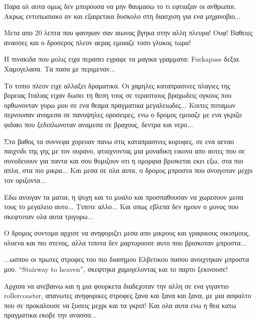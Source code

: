 Παρα ολ αυτα ομως δεν μπορουσα να μην θαυμασω το τι εφτιαξαν οι ανθρωποι. Ακρως εντυπωσιακο αν και εξαιρετικα δυσκολο στη διασχιση για ενα μηχανοβιο...

Μετα απο 20 λεπτα που φανηκαν σαν αιωνας βγηκα στην αλλη πλευρα! Ουφ! Βαθειες ανασσες και ο δροσερος πλεον αερας εμοιαζε τοσο γλυκος τωρα!


Η πινακιδα που μολις ειχα περασει εγραφε τα μαγικα γραμματα: Furkapass δεξια. 
Χαμογελασα. Τα πασα με περιμεναν...


Το τοπιο πλεον ειχε αλλαξει δραματικα. Οι χαμηλες καταπρασινες πλαγιες της βορειας Ιταλιας ειχαν δωσει τη θεση τους σε τεραστιους βραχωδεις ογκους που ορθωνονταν γυρω μου σε ενα θεαμα πραγματικα μεγαλειωδες...
Κοιτες ποταμων περνουσαν αναμεσα σε πανυψηλες οροσειρες, ενω ο δρομος εμοιαζε με ενα γκριζο φιδακι που ξεδιπλωνοταν αναμεσα σε βραχους, δεντρα και νερο...


Στο βαθος τα συννεφα χορευαν πανω στις καταπρασινες κορυφες, σε ενα αεναο παιχνιδι της γης με τον ουρανο, φτιαχνοντας μια μοναδικη εικονα απο αυτες που σε συνοδευουν για παντα και σου θυμιζουν οτι η ομορφια βρισκεται εκει εξω, στα πιο απλα, στα πιο μικρα... 
Και μεσα σε ολα αυτα, ο δρομος μπροστα που ανοιγοταν μεχρι τον οριζοντα... 


Εδω ανοιγαν τα ματια, η ψυχη και το μυαλο και προσπαθουσαν να χωρεσουν μεσα τους το μεγαλειο αυτο... Τιποτε αλλο...
Και οπως εβλεπα δεν ημουν ο μονος που σκεφτοταν ολα αυτα τριγυρω... 


O δρομος συντομα αρχισε να ανηφοριζει μεσα απο μικρους και γραφικους οικισμους, ολοενα και πιο στενος, αλλα τιποτα δεν μαρτυρουσε αυτο που βρισκοταν μπροστα...


...ωσπου οι πρωτες στροφες του πιο διασημου Ελβετικου πασου ανοιχτηκαν μπροστα μου. 
``Stairway to heaven'', σκεφτηκα χαμογελοντας και το παρτυ ξεκινουσε!


Αρχισα να ανεβαινω και η μια φουρκετα διαδεχοταν την αλλη σε ενα γιγαντιο rollercoaster, απανωτες ανηφορικες στροφες ξανα και ξανα και ξανα, με μια ασφαλτο που σε προκαλουσε να ξυσεις μεχρι και τα γκριπ! 
Και ολα αυτα ενω η θεα κατω πραγματικα εκοβε την ανασσα...

